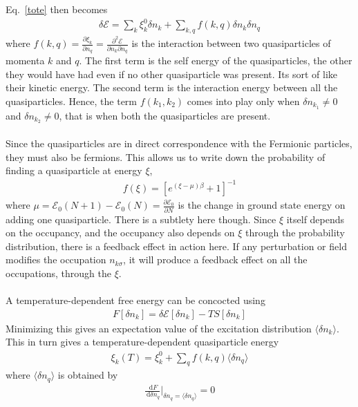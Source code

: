 \documentclass[twoside,11pt]{report}
\numberwithin{equation}{section}
\begin{document}
Eq.~\ref{tote} then becomes
\begin{equation}\begin{aligned}
\delta\mathcal{E} = \sum_k \xi^0_k \delta n_k + \sum_{k,q} f(k,q) \delta n_k \delta n_q
\end{aligned}\end{equation}
where \(f(k,q) = \frac{\partial{\xi_k}}{\partial{n_q}} = \frac{\partial^2 \mathcal{E}}{\partial n_k \partial n_q}\) is the interaction between two quasiparticles of momenta \(k\) and \(q\).
The first term is the self energy of the quasiparticles, the other they would have had even if no other quasiparticle was present.
Its sort of like their kinetic energy.
The second term is the interaction energy between all the quasiparticles.
Hence, the term \(f(k_1,k_2)\) comes into play only when \(\delta n_{k_1} \neq 0\) and \(\delta n_{k_2} \neq 0\), that is when both the quasiparticles are present.\\\\
Since the quasiparticles are in direct correspondence with the Fermionic particles, they must also be fermions.
This allows us to write down the probability of finding a quasiparticle at energy \(\xi\),
\begin{equation}\begin{aligned}
	f(\xi) = \left[e^{(\xi - \mu)\beta} + 1\right]^{-1}
\end{aligned}\end{equation}
where \(\mu = \mathcal{E_0}(N+1) - \mathcal{E_0}(N)= \frac{\partial{\mathcal{E}_0}}{\partial{N}}\) is the change in ground state energy on adding one quasiparticle.
There is a subtlety here though.
Since \(\xi\) itself depends on the occupancy, and the occupancy also depends on \(\xi\) through the probability distribution, there is a feedback effect in action here.
If any perturbation or field modifies the occupation \(n_{k\sigma}\), it will produce a feedback effect on all the occupations, through the \(\xi\).
\\\\
A temperature-dependent free energy can be concocted using
\begin{equation}\begin{aligned}
F[\delta n_k] = \delta \mathcal{E}[\delta n_k] - T S[\delta n_k]
\end{aligned}\end{equation}
Minimizing this gives an expectation value of the excitation distribution \(\langle \delta n_k\rangle\).
This in turn gives a temperature-dependent quasiparticle energy
\begin{equation}\begin{aligned}
	\label{temp_en}
	\xi_k(T) = \xi^0_k + \sum_{q} f(k,q)\langle \delta n_q\rangle
\end{aligned}\end{equation}
where \(\langle \delta n_q\rangle\) is obtained by
\begin{equation}\begin{aligned}
	\frac{\:\mathrm{d}F}{\:\mathrm{d}\delta n_q}\bigg|_{\delta n_q = \langle \delta n_{q}\rangle} = 0
\end{aligned}\end{equation}
\end{document}

